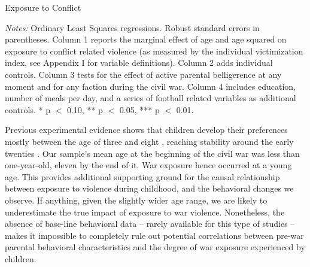 \begin{threeparttable}[tb]
	\caption{Exposure to Conflict}
	\label{tab:slf:conflictexposure}
	\centering
	\tiny
	
	\begin{tablenotes}
		\item \textit{Notes:} Ordinary Least Squares regressions. Robust standard errors in parentheses. Column 1 reports the marginal effect of age and age squared on exposure to conflict related violence (as measured by the individual victimization index, see Appendix I for variable definitions). Column 2 adds individual controls. Column 3 tests for the effect of active parental belligerence at any moment and for any faction during the civil war. Column 4 includes education, number of meals per day, and a series of football related variables as additional controls.  * p $<$ 0.10, ** p $<$ 0.05, *** p $<$ 0.01.
		\item
	\end{tablenotes}
\end{threeparttable}

Previous experimental evidence shows that children develop their preferences mostly between the age of three and eight \citep{Benenson2007,Fehr2008}, reaching stability around the early twenties \citep{Sutter2007a}. Our sample’s mean age at the beginning of the civil war was less than one-year-old, eleven by the end of it. War exposure hence occurred at a young age. This provides additional supporting ground for the causal relationship between exposure to violence during childhood, and the behavioral changes we observe. If anything, given the slightly wider age range, we are likely to underestimate the true impact of exposure to war violence. Nonetheless, the absence of base-line behavioral data – rarely available for this type of studies – makes it impossible to completely rule out potential correlations between pre-war parental behavioral characteristics and the degree of war exposure experienced by children. 


